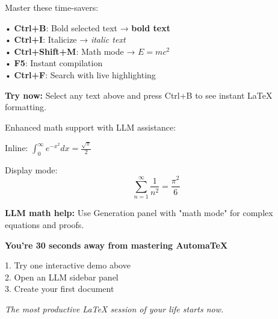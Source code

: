 \documentclass[12pt,a4paper]{article}
\begin{document}
\vspace{0.5cm}

\begin{tcolorbox}[colback=purple!8!white,colframe=purple!40!black,title=\textbf{Power User Shortcuts},left=5mm,right=5mm]
Master these time-savers:

• \textbf{Ctrl+B}: Bold selected text → \textbf{bold text} \\
• \textbf{Ctrl+I}: Italicize → \textit{italic text} \\
• \textbf{Ctrl+Shift+M}: Math mode → $E = mc^2$ \\
• \textbf{F5}: Instant compilation \\
• \textbf{Ctrl+F}: Search with live highlighting

\textbf{Try now:} Select any text above and press Ctrl+B to see instant LaTeX formatting.
\end{tcolorbox}

\vspace{0.5cm}

\begin{tcolorbox}[colback=teal!8!white,colframe=teal!40!black,title=\textbf{Math Mode Excellence},left=5mm,right=5mm]
Enhanced math support with LLM assistance:

Inline: $\int_0^\infty e^{-x^2} dx = \frac{\sqrt{\pi}}{2}$

Display mode:
\begin{equation}
\sum_{n=1}^{\infty} \frac{1}{n^2} = \frac{\pi^2}{6}
\end{equation}

\textbf{LLM math help:} Use Generation panel with "math mode" for complex equations and proofs.
\end{tcolorbox}

\vspace{0.8cm}

\begin{center}
\begin{tcolorbox}[colback=yellow!10!white,colframe=orange!60!black,title=\textbf{Ready to Explore?},width=0.8\textwidth]
\centering
\textbf{You're 30 seconds away from mastering AutomaTeX}

1. Try one interactive demo above \\
2. Open an LLM sidebar panel \\
3. Create your first document

\vspace{0.3cm}
\textit{The most productive LaTeX session of your life starts now.}
\end{tcolorbox}
\end{center}
\end{document}
